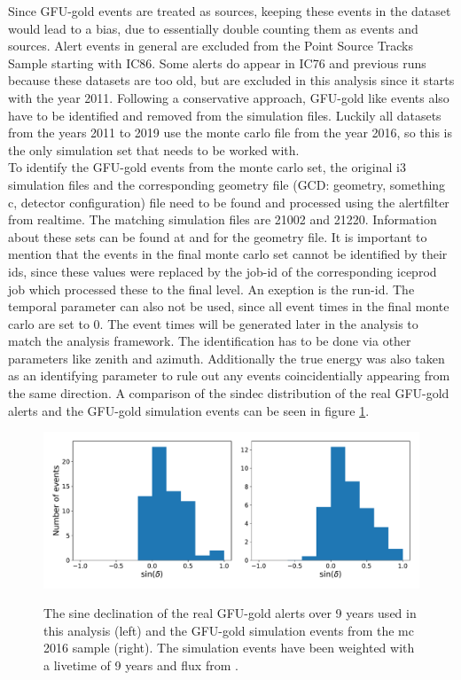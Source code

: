 Since GFU-gold events are treated as sources, keeping these events in the dataset would lead to a bias, due to essentially double counting them as events and sources.
Alert events in general are excluded from the Point Source Tracks Sample starting with IC86.
Some alerts do appear in IC76 and previous runs because these datasets are too old, but are excluded in this analysis since it starts with the year 2011.
Following a conservative approach, GFU-gold like events also have to be identified and removed from the simulation files.
Luckily all datasets from the years 2011 to 2019 use the monte carlo file from the year 2016, so this is the only simulation set that needs to be worked with.\\
To identify the GFU-gold events from the monte carlo set, the original i3 simulation files and the corresponding geometry file (GCD: geometry, something c, detector configuration) file need to be found and processed using the alertfilter from realtime.
The matching simulation files are 21002 and 21220.
Information about these sets can be found at \cite{sim} and \cite{gcd} for the geometry file.
It is important to mention that the events in the final monte carlo set cannot be identified by their ids, since these values were replaced by the job-id of the corresponding iceprod job which processed these to the final level. An exeption is the run-id.
The temporal parameter can also not be used, since all event times in the final monte carlo are set to \num{0}.
The event times will be generated later in the analysis to match the analysis framework.
The identification has to be done via other parameters like zenith and azimuth.
Additionally the true energy was also taken as an identifying parameter to rule out any events coincidentially appearing from the same direction.
A comparison of the sindec distribution of the real GFU-gold alerts and the GFU-gold simulation events can be seen in figure \ref{fig:gfu-gold-comp}.

\begin{figure}
    \centering
    \includegraphics[width=\linewidth]{Plots/03_data/gfu_gold_comp.pdf}
    \label{fig:gfu-gold-comp}
    \caption{The sine declination of the real GFU-gold alerts over 9 years used in this analysis (left) and the GFU-gold simulation events from the mc 2016 sample (right). The simulation events have been weighted with a livetime of 9 years and flux from \cite{flux}.}
\end{figure}

